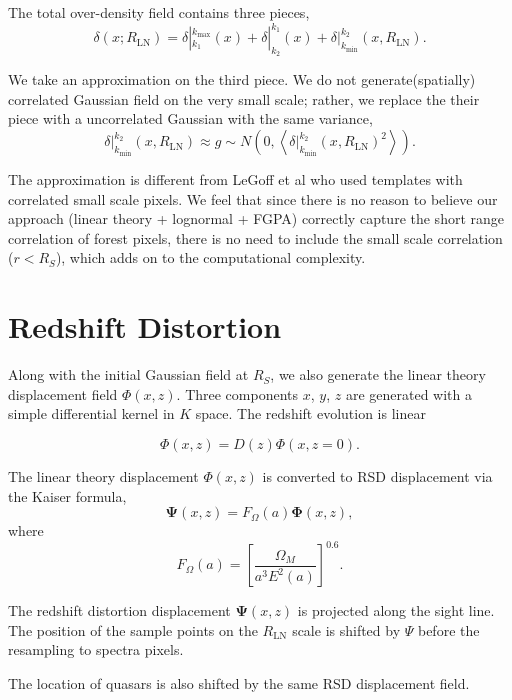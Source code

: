 \documentclass{paper}
\begin{document}
    The total over-density field contains three pieces,
    \[
        \delta(x; R_\mathrm{LN}) =
        \delta|_{k_1}^{k_\mathrm{max}}(x) +
        \delta|_{k_2}^{k_1}(x) +
        \delta|_{k_\mathrm{min}}^{k_2}(x, R_\mathrm{LN}).
    \]

    We take an approximation on the third piece. We do not
    generate(spatially) correlated Gaussian field on the
    very small scale; rather, we replace the their piece
    with a uncorrelated Gaussian with the same variance,
    \[
        \delta|_{k_\mathrm{min}}^{k_2}(x, R_\mathrm{LN})
        \approx g \sim N(0, \left<\delta|_{k_\mathrm{min}}^{k_2}(x,
        R_\mathrm{LN})^2\right>).
    \]
    
    The approximation is different from LeGoff et al who
    used templates with correlated small scale pixels.
    We feel that since there is no reason to believe our
    approach (linear theory + lognormal + FGPA) correctly capture the
    short range correlation of forest pixels, there is no need to
    include the small scale correlation ($r < R_S$), which adds on to the
    computational complexity.

\section{Redshift Distortion}
Along with the initial Gaussian field at $R_S$, we also generate the
linear theory displacement field $\Phi(x, z)$. Three components $x$,
$y$, $z$ are generated with a simple differential kernel in $K$ space.
The redshift evolution is linear

\[
    \Phi(x, z) = D(z) \Phi(x, z=0).
\]

The linear theory displacement $\Phi(x, z)$ is converted to RSD
displacement via the Kaiser formula,
\[
    \mathbf{\Psi}(x, z) = F_\Omega(a) \mathbf{\Phi}(x, z),
\]
where
\[
    F_\Omega(a) = \left[\frac{\Omega_M}{a^3 E^2(a)}\right]^{0.6} .
\]

The redshift distortion displacement $\mathbf{\Psi}(x, z)$ is projected along the
sight line. The position of the sample points on the $R_\mathrm{LN}$
scale is shifted by $\Psi$ before the resampling to spectra pixels.

The location of quasars is also shifted by the same RSD displacement
field.

\appendix
\end{document}
